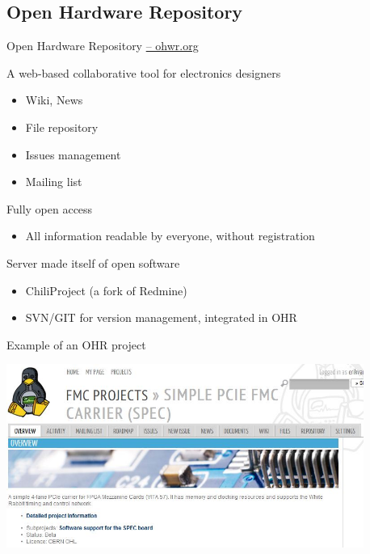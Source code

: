 \documentclass[compress,red]{beamer}
\begin{document}
\subsection{Open Hardware Repository}

\begin{frame}{Open Hardware Repository \href{http://ohwr.org}{-- ohwr.org}}
	\begin{block}{A web-based collaborative tool for electronics designers}
   \begin{itemize}
	\item Wiki, News
	\item File repository
	\item Issues management
	\item Mailing list
   \end{itemize}
	\end{block}

	\begin{block}{Fully open access}
 \begin{itemize}
	  \item 	All information readable by everyone, without registration
\end{itemize}
	\end{block}

	\begin{block}{Server made itself of open software}
   \begin{itemize}
	  \item ChiliProject (a fork of Redmine)
	  \item SVN/GIT for version management, integrated in OHR
   \end{itemize}
	\end{block}
\end{frame}



\begin{frame}{Example of an OHR project}
 \begin{center}
   \includegraphics[height=6cm]{ohr_spec_top.jpg}
 \end{center} 
\end{frame}
\end{document}
